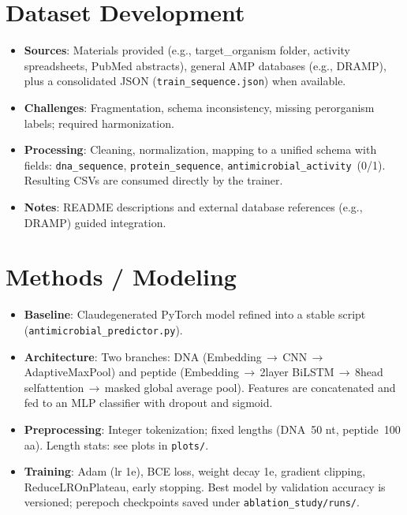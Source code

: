 \documentclass{article}
\begin{document}
\section{Dataset Development}
\begin{itemize}[leftmargin=*,nosep]
  \item \textbf{Sources}: Materials provided (e.g., target\_organism folder, activity spreadsheets, PubMed abstracts), general AMP databases (e.g., DRAMP), plus a consolidated JSON (\texttt{train\_sequence.json}) when available.
  \item \textbf{Challenges}: Fragmentation, schema inconsistency, missing per\-organism labels; required harmonization.
  \item \textbf{Processing}: Cleaning, normalization, mapping to a unified schema with fields: \texttt{dna\_sequence}, \texttt{protein\_sequence}, \texttt{antimicrobial\_activity}~(0/1). Resulting CSVs are consumed directly by the trainer.
  \item \textbf{Notes}: README descriptions and external database references (e.g., DRAMP) guided integration.
\end{itemize}

\section{Methods / Modeling}
\begin{itemize}[leftmargin=*,nosep]
  \item \textbf{Baseline}: Claude\-generated PyTorch model refined into a stable script (\texttt{antimicrobial\_predictor.py}).
  \item \textbf{Architecture}: Two branches: DNA (Embedding\,$\rightarrow$\,CNN\,$\rightarrow$\,AdaptiveMaxPool) and peptide (Embedding\,$\rightarrow$\,2\-layer BiLSTM\,$\rightarrow$\,8\-head self\-attention\,$\rightarrow$\,masked global average pool). Features are concatenated and fed to an MLP classifier with dropout and sigmoid.
  \item \textbf{Preprocessing}: Integer tokenization; fixed lengths (DNA~50 nt, peptide~100 aa). Length stats: see plots in \texttt{plots/}.
  \item \textbf{Training}: Adam (lr 1e), BCE loss, weight decay 1e, gradient clipping, ReduceLROnPlateau, early stopping. Best model by validation accuracy is versioned; per\-epoch checkpoints saved under \texttt{ablation\_study/runs/}.
\end{itemize}
\end{document}
